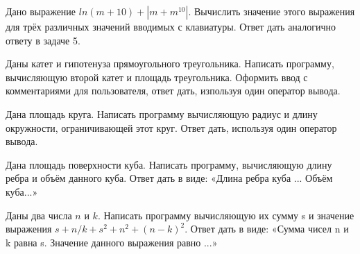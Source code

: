 \task Дано выражение $ln(m+10)+|m+m^10|$. Вычислить значение этого
выражения для трёх различных значений вводимых с клавиатуры. Ответ
дать аналогично ответу в задаче 5.

\task Даны катет и гипотенуза прямоугольного треугольника. Написать
программу, вычисляющую второй катет и площадь треугольника. Оформить
ввод с комментариями для пользователя, ответ дать, изпользуя один
оператор вывода.

\task Дана площадь круга. Написать программу вычисляющую радиус и
длину окружности, ограничивающей этот круг. Ответ дать, используя один
оператор вывода.

\task Дана площадь поверхности куба. Написать программу, вычисляющую
длину ребра и объём данного куба. Ответ дать в виде: «Длина ребра куба
... Объём куба...»

\task Даны два числа $n$ и $k$. Написать программу вычисляющую их сумму s
и значение выражения $s+ n/k+s^2+n^2+(n-k)^2$. Ответ дать в
виде: «Сумма чисел n и k равна s. Значение данного выражения равно ...»

